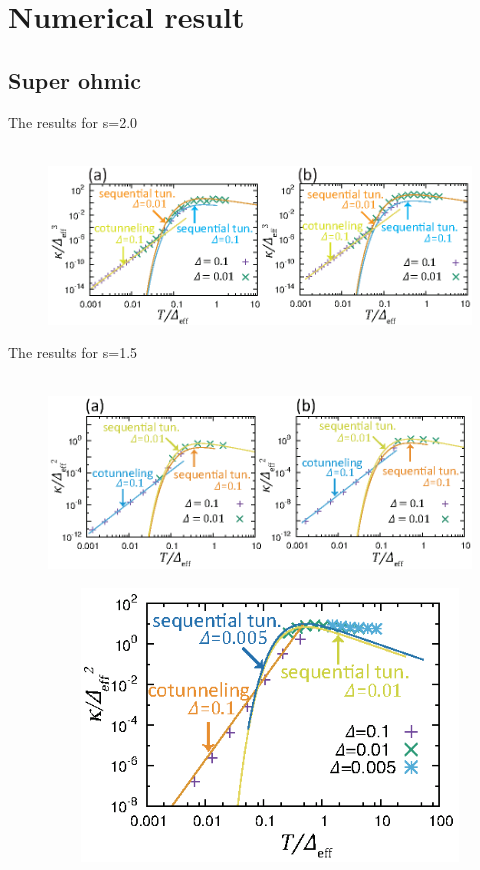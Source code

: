 \section{Numerical result}
\subsection{Super ohmic}
The results for s=2.0
\begin{figure}[tb]
　\centering
　\includegraphics[width=165mm]{conductance_s2.0.eps}
　\caption{}
\end{figure}

The results for s=1.5
\begin{figure}[tb]
　\centering
　\includegraphics[width=165mm]{conductance_s1.5.eps}
　\caption{}
\end{figure}

\begin{figure}[tb]
　\centering
　\includegraphics[width=100mm]{conductance_s1.5_alpha1.0.eps}
　\caption{}
\end{figure}
